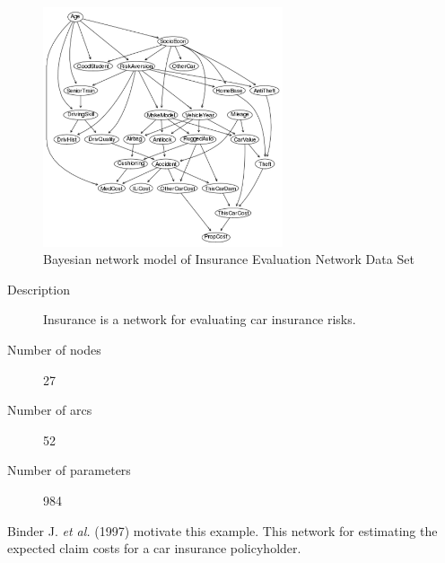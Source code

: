 	\begin{figure}[h]
	\centering
		\includegraphics[height=200pt]{Real_Insurance}
		\caption{Bayesian network model of Insurance Evaluation Network Data Set}
	\end{figure}	

\begin{description}
	\item[Description] Insurance is a network for evaluating car insurance risks.

	\item[Number of nodes] 27
	
	\item[Number of arcs] 52
	
	\item[Number of parameters] 984
\end{description}

Binder J. \emph{et al.} (1997) motivate this example. This network for estimating the expected claim costs for a car insurance policyholder.

